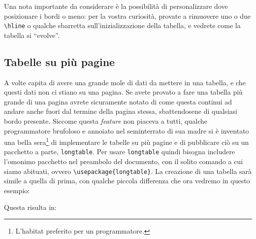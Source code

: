 Una nota importante da considerare è la possibilità di personalizzare dove 
posizionare i bordi o meno: per la vostra curiosità, provate a rimuovere uno o 
due \verb!\hline! o qualche sbarretta sull'inizializzazione della tabella, e 
vedrete come la tabella si ``evolve''.

\subsection{Tabelle su più pagine}

A volte capita di avere una grande mole di dati da mettere in una tabella, e 
che questi dati non ci stiano su una pagina. Se avete provato a fare una 
tabella più grande di una pagina avrete sicuramente notato di come questa 
continui ad andare anche fuori dal termine della pagina stessa, sbattendosene 
di qualsiasi bordo presente. Siccome questa \textit{feature} non piaceva a 
tutti, qualche programmatore brufoloso e annoiato nel seminterrato di sua madre 
si è inventato una bella sera\footnote{L'habitat preferito per un 
programmatore.} di implementare le tabelle su più pagine e di pubblicare ciò su 
un pacchetto a parte, \texttt{longtable}.
Per usare \texttt{longtable} quindi bisogna includere l'omonimo pacchetto nel 
preambolo del documento, con il solito comando a cui siamo abituati, ovvero 
\verb!\usepackage{longtable}!.
La creazione di una tabella sarà simile a quella di prima, con qualche piccola 
differenza che ora vedremo in questo esempio:


Questa risulta in:

